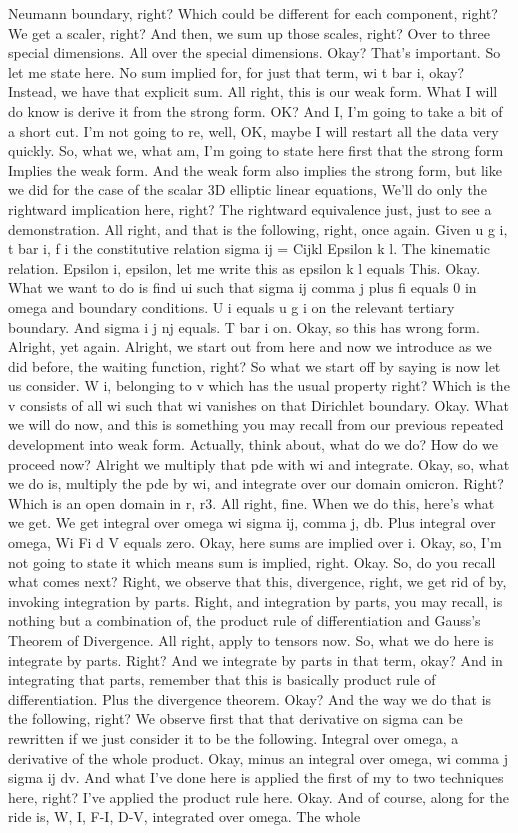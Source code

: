 \documentclass[10pt]{article}
\begin{document}
Neumann boundary, right? Which could be different for each component, right? We get a scaler, right? And then, we sum up those scales, right? Over to three special dimensions. All over the special dimensions. Okay? That's important. So let me state here. No sum implied for, for just that term, wi t bar i, okay? Instead, we have that explicit sum. All right, this is our weak form. What I will do know is derive it from the strong form. OK? And I, I'm going to take a bit of a short cut. I'm not going to re, well, OK, maybe I will restart all the data very quickly. So, what we, what am, I'm going to state here first that the strong form Implies the weak form. And the weak form also implies the strong form, but like we did for the case of the scalar 3D elliptic linear equations, We'll do only the rightward implication here, right? The rightward equivalence just, just to see a demonstration. All right, and that is the following, right, once again. Given u g i, t bar i, f i the constitutive relation sigma ij = Cijkl Epsilon k l. The kinematic relation. Epsilon i, epsilon, let me write this as epsilon k l equals This. Okay. What we want to do is find ui such that sigma ij comma j plus fi equals 0 in omega and boundary conditions. U i equals u g i on the relevant tertiary boundary. And sigma i j nj equals. T bar i on. Okay, so this has wrong form. Alright, yet again. Alright, we start out from here and now we introduce as we did before, the waiting function, right? So what we start off by saying is now let us consider. W i, belonging to v which has the usual property right? Which is the v consists of all wi such that wi vanishes on that Dirichlet boundary. Okay. What we will do now, and this is something you may recall from our previous repeated development into weak form. Actually, think about, what do we do? How do we proceed now? Alright we multiply that pde with wi and integrate. Okay, so, what we do is, multiply the pde by wi, and integrate over our domain omicron. Right? Which is an open domain in r, r3. All right, fine. When we do this, here's what we get. We get integral over omega wi sigma ij, comma j, db. Plus integral over omega, Wi Fi d V equals zero. Okay, here sums are implied over i. Okay, so, I'm not going to state it which means sum is implied, right. Okay. So, do you recall what comes next? Right, we observe that this, divergence, right, we get rid of by, invoking integration by parts. Right, and integration by parts, you may recall, is nothing but a combination of, the product rule of differentiation and Gauss's Theorem of Divergence. All right, apply to tensors now. So, what we do here is integrate by parts. Right? And we integrate by parts in that term, okay? And in integrating that parts, remember that this is basically product rule of differentiation. Plus the divergence theorem. Okay? And the way we do that is the following, right? We observe first that that derivative on sigma can be rewritten if we just consider it to be the following. Integral over omega, a derivative of the whole product. Okay, minus an integral over omega, wi comma j sigma ij dv. And what I've done here is applied the first of my to two techniques here, right? I've applied the product rule here. Okay. And of course, along for the ride is, W, I, F-I, D-V, integrated over omega. The whole 
\end{document}
